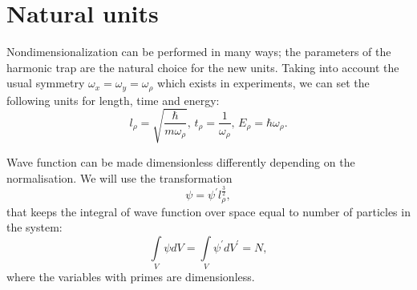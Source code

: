 \chapter{Natural units}
\label{cha:appendix:natural-units}

Nondimensionalization can be performed in many ways;
the parameters of the harmonic trap are the natural choice for the new units.
Taking into account the usual symmetry $\omega_x = \omega_y = \omega_\rho$ which exists in experiments,
we can set the following units for length, time and energy:
\[
	l_\rho = \sqrt{\frac{\hbar}{m\omega_\rho}},\,
	t_\rho = \frac{1}{\omega_\rho},\,
	E_\rho = \hbar \omega_\rho.
\]

Wave function can be made dimensionless differently depending on the normalisation.
We will use the transformation
\[
	\psi = \psi^\prime l_\rho^\frac{3}{2},
\]
that keeps the integral of wave function over space equal to number of particles in the system:
\[
	\int\limits_V \psi dV = \int\limits_V \psi^\prime dV^\prime = N,
\]
where the variables with primes are dimensionless.

